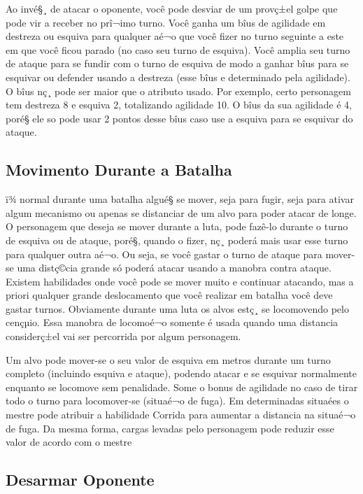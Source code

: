 Ao invé§¸ de atacar o oponente, você pode desviar de um provç±el golpe que pode vir a receber no prî¬imo turno. Você ganha um bîus de agilidade em destreza ou esquiva para qualquer aé¬o que você fizer no turno seguinte a este em que você ficou parado (no caso seu turno de esquiva). Você amplia seu turno de ataque para se fundir com o turno de esquiva de modo a ganhar bîus para se esquivar ou defender usando a destreza (esse bîus e determinado pela agilidade). O bîus nç¸ pode ser maior que o atributo usado. Por exemplo, certo personagem tem destreza 8 e esquiva 2, totalizando agilidade 10. O bîus da sua agilidade é 4, poré§ ele so pode usar 2 pontos desse bîus caso use a esquiva para se esquivar do ataque.


\subsection{Movimento Durante a Batalha}

ï¾ normal durante uma batalha algué§ se mover, seja para fugir, seja para ativar algum mecanismo ou apenas se distanciar de um alvo para poder atacar de longe. O personagem que deseja se mover durante a luta, pode fazê-lo durante o turno de esquiva ou de ataque, poré§, quando o fizer, nç¸ poderá mais usar esse turno para qualquer outra aé¬o. Ou seja, se você gastar o turno de ataque para mover-se uma distç©cia grande só poderá atacar usando a manobra contra ataque. Existem habilidades onde você pode se mover muito e continuar atacando, mas a priori qualquer grande deslocamento que você realizar em batalha você deve gastar turnos. Obviamente durante uma luta os alvos estç¸ se locomovendo pelo cençµio. Essa manobra de locomoé¬o somente é usada quando uma distancia considerç±el vai ser percorrida por algum personagem.

	Um alvo pode mover-se o seu valor de esquiva em metros durante um turno completo (incluindo esquiva e ataque), podendo atacar e se esquivar normalmente enquanto se locomove sem penalidade. Some o bonus de agilidade no caso de tirar todo o turno para locomover-se (situaé¬o de fuga). Em determinadas situaées o mestre pode atribuir a habilidade Corrida para aumentar a distancia na situaé¬o de fuga. Da mesma forma, cargas levadas pelo personagem pode reduzir esse valor de acordo com o mestre
	
	
\subsection{Desarmar Oponente}

